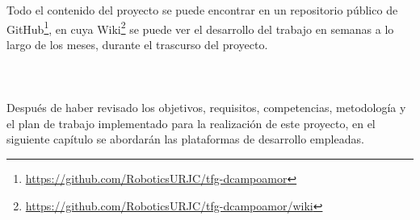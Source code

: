 \pagebreak
Todo el contenido del proyecto se puede encontrar en un repositorio público de GitHub\footnote{\url{https://github.com/RoboticsURJC/tfg-dcampoamor}}, en cuya Wiki\footnote{\url{https://github.com/RoboticsURJC/tfg-dcampoamor/wiki}} se puede ver el desarrollo del trabajo en semanas a lo largo de los meses, durante el trascurso del proyecto.\\
\\
\\
\\
Después de haber revisado los objetivos, requisitos, competencias, metodología y el plan de trabajo implementado para la realización de este proyecto, en el siguiente capítulo se abordarán las plataformas de desarrollo empleadas.

